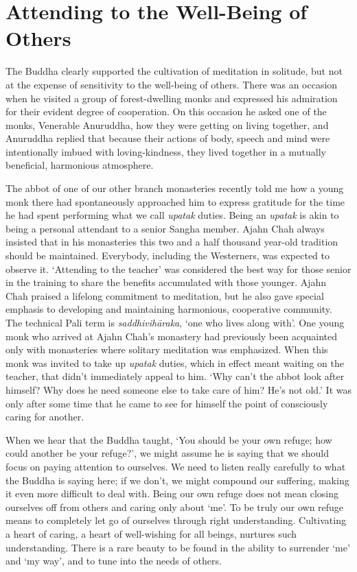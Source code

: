 \section{Attending to the Well-Being of Others}

The Buddha clearly supported the cultivation of meditation in solitude,
but not at the expense of sensitivity to the well-being of others. There
was an occasion when he visited a group of forest-dwelling monks and
expressed his admiration for their evident degree of cooperation. On
this occasion he asked one of the monks, Venerable Anuruddha, how they
were getting on living together, and Anuruddha replied that because
their actions of body, speech and mind were intentionally imbued with
loving-kindness, they lived together in a mutually beneficial,
harmonious atmosphere.

The abbot of one of our other branch monasteries recently told me how a
young monk there had spontaneously approached him to express gratitude
for the time he had spent performing what we call \emph{upatak} duties. Being
an \emph{upatak} is akin to being a personal attendant to a senior Sangha
member. Ajahn Chah always insisted that in his monasteries this two and
a half thousand year-old tradition should be maintained. Everybody,
including the Westerners, was expected to observe it. ‘Attending to the
teacher’ was considered the best way for those senior in the training to
share the benefits accumulated with those younger. Ajahn Chah praised a
lifelong commitment to meditation, but he also gave special emphasis to
developing and maintaining harmonious, cooperative community. The
technical Pali term is \emph{saddhivihāraka}, ‘one who lives along with’. One
young monk who arrived at Ajahn Chah’s monastery had previously been
acquainted only with monasteries where solitary meditation was
emphasized. When this monk was invited to take up \emph{upatak} duties, which
in effect meant waiting on the teacher, that didn’t immediately appeal
to him. ‘Why can’t the abbot look after himself? Why does he need
someone else to take care of him? He’s not old.’ It was only after some
time that he came to see for himself the point of consciously caring for
another.

When we hear that the Buddha taught, ‘You should be your own refuge; how could
another be your refuge?’,\cite{dhp-attahi}
we might assume he is saying that
we should focus on paying attention to ourselves. We need to listen
really carefully to what the Buddha is saying here; if we don’t, we
might compound our suffering, making it even more difficult to deal
with. Being our own refuge does not mean closing ourselves off from
others and caring only about ‘me’. To be truly our own refuge means to
completely let go of ourselves through right understanding. Cultivating
a heart of caring, a heart of well-wishing for all beings, nurtures such
understanding. There is a rare beauty to be found in the ability to
surrender ‘me’ and ‘my way’, and to tune into the needs of others.

